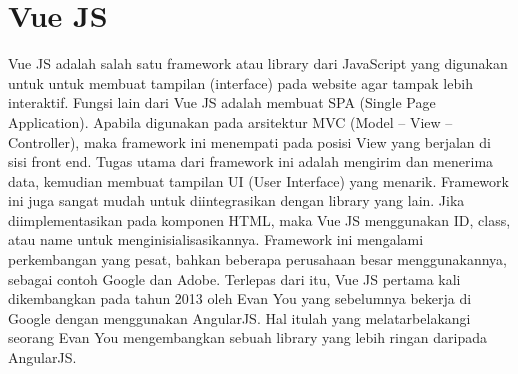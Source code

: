 \section{Vue JS}
Vue JS adalah salah satu framework atau library dari JavaScript yang digunakan untuk untuk membuat tampilan (interface) pada website agar tampak lebih interaktif.
Fungsi lain dari Vue JS adalah membuat SPA (Single Page Application). Apabila digunakan pada arsitektur MVC (Model – View – Controller), maka framework ini menempati pada posisi View yang berjalan di sisi front end.
Tugas utama dari framework ini adalah mengirim dan menerima data, kemudian membuat tampilan UI (User Interface) yang menarik. Framework ini juga sangat mudah untuk diintegrasikan dengan library yang lain.
Jika diimplementasikan pada komponen HTML, maka Vue JS menggunakan ID, class, atau name untuk menginisialisasikannya.
Framework ini mengalami perkembangan yang pesat, bahkan beberapa perusahaan besar menggunakannya, sebagai contoh Google dan Adobe. Terlepas dari itu, Vue JS pertama kali dikembangkan pada tahun 2013 oleh Evan You yang sebelumnya bekerja di Google dengan menggunakan AngularJS.
Hal itulah yang melatarbelakangi seorang Evan You mengembangkan sebuah library yang lebih ringan daripada AngularJS.

